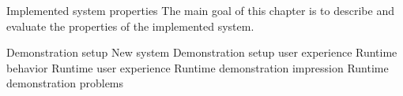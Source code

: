 \chap Implemented system properties
The main goal of this chapter is to describe and evaluate the properties of the implemented system.

\sec Demonstration setup
\secc New system
\sec Demonstration setup user experience
\sec Runtime behavior
\sec Runtime user experience
\sec Runtime demonstration impression
\sec Runtime demonstration problems